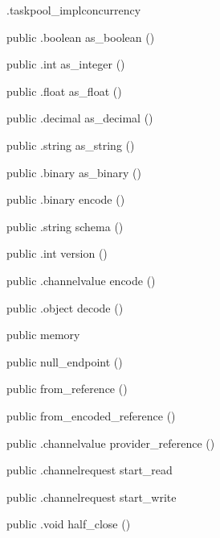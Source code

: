 \begin{CrexxClass}{.taskpool\_impl}{concurrency}
\begin{Members}
    \Method
      {public}
      {.boolean}
      {as\_boolean}
      {()}

    \Method
      {public}
      {.int}
      {as\_integer}
      {()}

    \Method
      {public}
      {.float}
      {as\_float}
      {()}

    \Method
      {public}
      {.decimal}
      {as\_decimal}
      {()}

    \Method
      {public}
      {.string}
      {as\_string}
      {()}

    \Method
      {public}
      {.binary}
      {as\_binary}
      {()}

    \Method
      {public}
      {.binary}
      {encode}
      {()}

    \Method
      {public}
      {.string}
      {schema}
      {()}

    \Method
      {public}
      {.int}
      {version}
      {()}

    \Method
      {public}
      {.channelvalue}
      {encode}
      {()}

    \Method
      {public}
      {.object}
      {decode}
      {()}

    \Factory
      {public}
      {memory}
      {}

    \Factory
      {public}
      {null\_endpoint}
      {()}

    \Factory
      {public}
      {from\_reference}
      {()}

    \Factory
      {public}
      {from\_encoded\_reference}
      {()}

    \Method
      {public}
      {.channelvalue}
      {provider\_reference}
      {()}

    \Method
      {public}
      {.channelrequest}
      {start\_read}
      {}

    \Method
      {public}
      {.channelrequest}
      {start\_write}
      {}

    \Method
      {public}
      {.void}
      {half\_close}
      {()}


\end{Members}
\end{CrexxClass}
